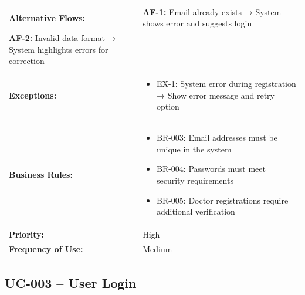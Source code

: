 \documentclass[12pt,a4paper]{article}
\begin{document}
\begin{longtable}{|p{4.5cm}|p{10.5cm}|}
\hline
\textbf{Alternative Flows:} &
\textbf{AF-1:} Email already exists → System shows error and suggests login \\
\textbf{AF-2:} Invalid data format → System highlights errors for correction \\
\hline
\textbf{Exceptions:} &
\begin{itemize}
  \item EX-1: System error during registration → Show error message and retry option
\end{itemize} \\
\hline
\textbf{Business Rules:} &
\begin{itemize}
  \item BR-003: Email addresses must be unique in the system
  \item BR-004: Passwords must meet security requirements
  \item BR-005: Doctor registrations require additional verification
\end{itemize} \\
\hline
\textbf{Priority:} & High \\
\hline
\textbf{Frequency of Use:} & Medium \\
\hline
\end{longtable}

\subsection{UC-003 – User Login}
\end{document}
